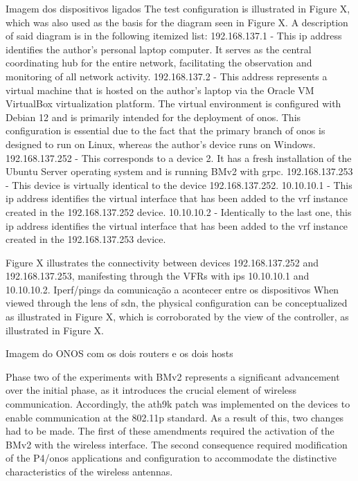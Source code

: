Imagem dos dispositivos ligados
The test configuration is illustrated in Figure X, which was also used as the basis for the diagram seen in Figure X. A description of said diagram is in the following itemized list:
192.168.137.1 - This \gls{ip} address identifies the author's personal laptop computer. It serves as the central coordinating hub for the entire network, facilitating the observation and monitoring of all network activity.
192.168.137.2 - This address represents a virtual machine that is hosted on the author's laptop via the Oracle VM VirtualBox virtualization platform. The virtual environment is configured with Debian 12 and is primarily intended for the deployment of \gls{onos}. This configuration is essential due to the fact that the primary branch of \gls{onos} is designed to run on Linux, whereas the author's device runs on Windows.
192.168.137.252 - This corresponds to a device 2. It has a fresh installation of the Ubuntu Server operating system and is running BMv2 with grpc.
192.168.137.253 - This device is virtually identical to the device 192.168.137.252.
10.10.10.1 - This \gls{ip} address identifies the virtual interface that has been added to the \gls{vrf} instance created in the 192.168.137.252 device.
10.10.10.2 - Identically to the last one, this \gls{ip} address identifies the virtual interface that has been added to the \gls{vrf} instance created in the 192.168.137.253 device.

Figure X illustrates the connectivity between devices 192.168.137.252 and 192.168.137.253, manifesting through the VFRs with \glspl{ip} 10.10.10.1 and 10.10.10.2.
Iperf/pings da comunicação a acontecer entre os dispositivos
When viewed through the lens of \gls{sdn}, the physical configuration can be conceptualized as illustrated in Figure X, which is corroborated by the view of the controller, as illustrated in Figure X.

Imagem do ONOS com os dois routers e os dois hosts

Phase two of the experiments with BMv2 represents a significant advancement over the initial phase, as it introduces the crucial element of wireless communication. Accordingly, the ath9k patch was implemented on the devices to enable communication at the 802.11p standard.
As a result of this, two changes had to be made. The first of these amendments required the activation of the BMv2 with the wireless interface. The second consequence required modification of the P4/\gls{onos} applications and configuration to accommodate the distinctive characteristics of the wireless antennas.


